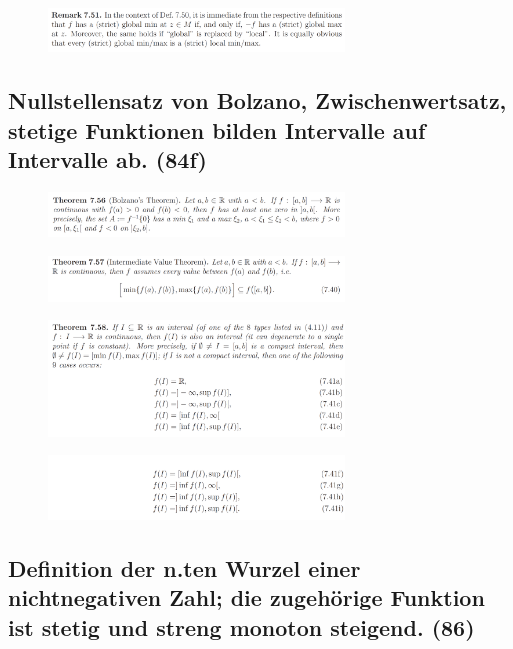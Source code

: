 \begin{figure}[H] \centering
\includegraphics[width=0.7\textwidth]{media/7-18.png}
\end{figure}

\subsection{Nullstellensatz von Bolzano, Zwischenwertsatz, stetige Funktionen bilden Intervalle auf Intervalle ab. (84f)}

\begin{figure}[H] \centering
\includegraphics[width=0.7\textwidth]{media/7-19.png}
\end{figure}
\begin{figure}[H] \centering
\includegraphics[width=0.7\textwidth]{media/7-19-2.png}
\end{figure}
\begin{figure}[H] \centering
\includegraphics[width=0.7\textwidth]{media/7-19-3.png}
\end{figure}
\begin{figure}[H] \centering
\includegraphics[width=0.7\textwidth]{media/7-19-4.png}
\end{figure}

\subsection{Definition der n.ten Wurzel einer nichtnegativen Zahl; die zugehörige Funktion ist stetig und streng monoton steigend. (86)}

